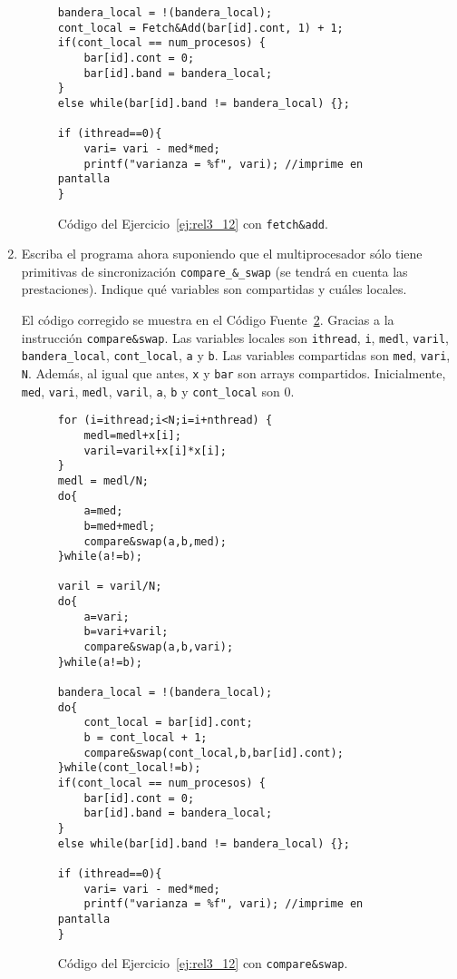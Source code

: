 \begin{ejercicio}
\begin{enumerate}
\begin{figure}
\begin{verbatim}
bandera_local = !(bandera_local);
cont_local = Fetch&Add(bar[id].cont, 1) + 1;
if(cont_local == num_procesos) {
    bar[id].cont = 0;
    bar[id].band = bandera_local;
}
else while(bar[id].band != bandera_local) {};

if (ithread==0){
    vari= vari - med*med;
    printf("varianza = %f", vari); //imprime en pantalla
} 
            \end{verbatim}
            \caption{Código del Ejercicio~\ref{ej:rel3_12} con \texttt{fetch\&add}.}
            \label{cod:ej_rel3_12_c}
        \end{figure}

        \item Escriba el programa ahora suponiendo que el multiprocesador sólo tiene primitivas de
        sincronización \verb|compare_&_swap| (se tendrá en cuenta las prestaciones). Indique qué variables son
        compartidas y cuáles locales.

        El código corregido se muestra en el Código Fuente~\ref{cod:ej_rel3_12_d}. Gracias a la instrucción \verb|compare&swap|.
        Las variables locales son \verb|ithread|, \verb|i|, \verb|medl|, \verb|varil|, \verb|bandera_local|, \verb|cont_local|,
        \verb|a| y \verb|b|. Las variables compartidas son \verb|med|, \verb|vari|, \verb|N|. Además, al igual que antes,
        \verb|x| y \verb|bar| son arrays compartidos. Inicialmente,
        \verb|med|, \verb|vari|, \verb|medl|, \verb|varil|, \verb|a|, \verb|b| y \verb|cont_local| son 0.
        \begin{figure}
            \centering
            \begin{verbatim}
for (i=ithread;i<N;i=i+nthread) {
    medl=medl+x[i];
    varil=varil+x[i]*x[i];
}
medl = medl/N;
do{
    a=med;
    b=med+medl;
    compare&swap(a,b,med);
}while(a!=b);

varil = varil/N;
do{
    a=vari;
    b=vari+varil;
    compare&swap(a,b,vari);
}while(a!=b);

bandera_local = !(bandera_local);
do{
    cont_local = bar[id].cont;
    b = cont_local + 1;
    compare&swap(cont_local,b,bar[id].cont);
}while(cont_local!=b);
if(cont_local == num_procesos) {
    bar[id].cont = 0;
    bar[id].band = bandera_local;
}
else while(bar[id].band != bandera_local) {};

if (ithread==0){
    vari= vari - med*med;
    printf("varianza = %f", vari); //imprime en pantalla
} 
            \end{verbatim}
            \caption{Código del Ejercicio~\ref{ej:rel3_12} con \texttt{compare\&swap}.}
            \label{cod:ej_rel3_12_d}
        \end{figure}

    \end{enumerate}
\end{ejercicio}

